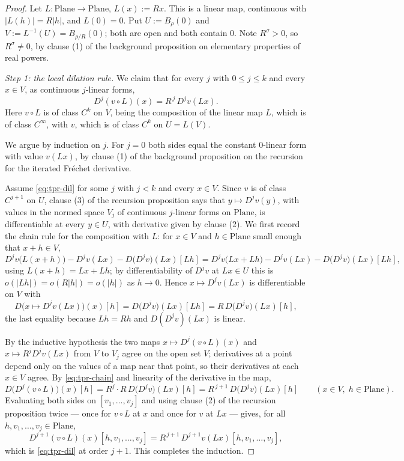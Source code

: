 \begin{proof}
Let $L\colon\mathrm{Plane}\to\mathrm{Plane}$, $L(x):=Rx$.  This is a linear map, continuous
with $\lvert L(h)\rvert=R\lvert h\rvert$, and $L(0)=0$.  Put $U:=B_{\rho}(0)$ and
$V:=L^{-1}(U)=B_{\rho/R}(0)$; both are open and both contain $0$.  Note $R^{\sigma}>0$, so
$R^{\sigma}\ne0$, by clause (1) of the background proposition on elementary properties of real
powers.

\medskip\noindent\emph{Step 1: the local dilation rule.}
We claim that for every $j$ with $0\le j\le k$ and every $x\in V$, as continuous $j$-linear
forms,
\begin{equation}\label{eq:tpr-dil}
  D^{j}(v\circ L)(x)=R^{\,j}\,D^{j}v(Lx).
\end{equation}
Here $v\circ L$ is of class $C^{k}$ on $V$, being the composition of the linear map $L$, which
is of class $C^{\infty}$, with $v$, which is of class $C^{k}$ on $U=L(V)$.

We argue by induction on $j$.  For $j=0$ both sides equal the constant $0$-linear form with
value $v(Lx)$, by clause (1) of the background proposition on the recursion for the iterated
Fr\'echet derivative.

Assume \eqref{eq:tpr-dil} for some $j$ with $j<k$ and every $x\in V$.  Since $v$ is of class
$C^{j+1}$ on $U$, clause (3) of the recursion proposition says that $y\mapsto D^{j}v(y)$, with
values in the normed space $V_j$ of continuous $j$-linear forms on $\mathrm{Plane}$, is
differentiable at every $y\in U$, with derivative given by clause (2).  We first record the
chain rule for the composition with $L$: for $x\in V$ and $h\in\mathrm{Plane}$ small enough
that $x+h\in V$,
\[
  D^{j}v\bigl(L(x+h)\bigr)-D^{j}v(Lx)-D\bigl(D^{j}v\bigr)(Lx)[Lh]
  =D^{j}v\bigl(Lx+Lh\bigr)-D^{j}v(Lx)-D\bigl(D^{j}v\bigr)(Lx)[Lh],
\]
using $L(x+h)=Lx+Lh$; by differentiability of $D^{j}v$ at $Lx\in U$ this is $o(\lvert
Lh\rvert)=o(R\lvert h\rvert)=o(\lvert h\rvert)$ as $h\to0$.  Hence $x\mapsto D^{j}v(Lx)$ is
differentiable on $V$ with
\begin{equation}\label{eq:tpr-chain}
  D\bigl(x\mapsto D^{j}v(Lx)\bigr)(x)[h]=D\bigl(D^{j}v\bigr)(Lx)[Lh]
  =R\,D\bigl(D^{j}v\bigr)(Lx)[h],
\end{equation}
the last equality because $Lh=Rh$ and $D(D^{j}v)(Lx)$ is linear.

By the inductive hypothesis the two maps $x\mapsto D^{j}(v\circ L)(x)$ and $x\mapsto
R^{j}D^{j}v(Lx)$ from $V$ to $V_j$ agree on the open set $V$; derivatives at a point depend
only on the values of a map near that point, so their derivatives at each $x\in V$ agree.  By
\eqref{eq:tpr-chain} and linearity of the derivative in the map,
\[
  D\bigl(D^{j}(v\circ L)\bigr)(x)[h]=R^{j}\cdot R\,D\bigl(D^{j}v\bigr)(Lx)[h]
  =R^{\,j+1}\,D\bigl(D^{j}v\bigr)(Lx)[h]\qquad(x\in V,\;h\in\mathrm{Plane}).
\]
Evaluating both sides on $[v_1,\ldots,v_j]$ and using clause (2) of the recursion proposition
twice --- once for $v\circ L$ at $x$ and once for $v$ at $Lx$ --- gives, for all
$h,v_1,\ldots,v_j\in\mathrm{Plane}$,
\[
  D^{j+1}(v\circ L)(x)[h,v_1,\ldots,v_j]=R^{\,j+1}\,D^{j+1}v(Lx)[h,v_1,\ldots,v_j],
\]
which is \eqref{eq:tpr-dil} at order $j+1$.  This completes the induction.


\end{proof}
